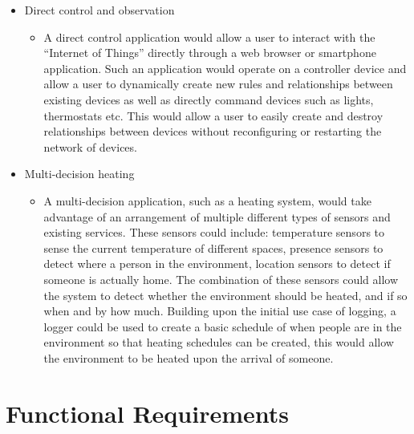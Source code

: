 \begin{itemize}
\begin{itemize}
	\end{itemize}
	\item Direct control and observation
	\begin{itemize}
		\item A direct control application would allow a user to interact with the ``Internet of Things'' directly through a web browser or smartphone application. Such an application would operate on a controller device and allow a user to dynamically create new rules and relationships between existing devices as well as directly command devices such as lights, thermostats etc.
		This would allow a user to easily create and destroy relationships between devices without reconfiguring or restarting the network of devices.
	\end{itemize}
	\item Multi-decision heating
	\begin{itemize}
		\item A multi-decision application, such as a heating system, would take advantage of an arrangement of multiple different types of sensors and existing services. These sensors could include: temperature sensors to sense the current temperature of different spaces, presence sensors to detect where a person in the environment, location sensors to detect if someone is actually home. The combination of these sensors could allow the system to detect whether the environment should be heated, and if so when and by how much. Building upon the initial use case of logging, a logger could be used to create a basic schedule of when people are in the environment so that heating schedules can be created, this would allow the environment to be heated upon the arrival of someone.
	\end{itemize}
\end{itemize}

\section{Functional Requirements} %
\label{sec:functional_requirements}

